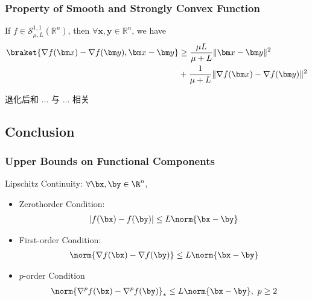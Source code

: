 
\subsubsection{Property of Smooth and Strongly Convex Function}

\begin{theorem}
    If $f\in \mathcal{S}_{\mu,L}^{1,1}(\mathbb{R}^n)$, then $\forall \bm x,\bm y\in \mathbb{R}^n$, we have
    \begin{align*}
        \braket{\nabla f(\bm x)-\nabla f(\bm y), \bm x-\bm y}&\ge \frac{\mu L}{\mu+L}\|\bm x-\bm y\|^2\\
        &+\frac{1}{\mu+L}\|\nabla f(\bm x)-\nabla f(\bm y)\|^2
    \end{align*}
\end{theorem}
退化后和 ... 与 ... 相关 %

\subsection{Conclusion}
\subsubsection{Upper Bounds on Functional Components}
Lipschitz Continuity: $\forall \bx,\by\in\R^n$,
\begin{itemize}
    \item Zerothorder Condition:
    \begin{align*}
        |f(\bx)-f(\by)|\le L\norm{\bx-\by}
    \end{align*}
    \item First-order Condition:
    \begin{align*}
        \norm{\nabla f(\bx)-\nabla f(\by)}\le L\norm{\bx-\by}
    \end{align*}
    \item $p$-order Condition
    \begin{align*}
        \norm{\nabla^p f(\bx)-\nabla^p f(\by)}_*\le L\norm{\bx-\by},\ p\ge 2
    \end{align*}
\end{itemize}

